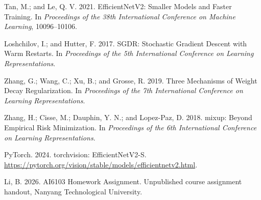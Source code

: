 \documentclass[letterpaper]{article} %
\begin{document}
\begin{thebibliography}{}

Tan, M.; and Le, Q. V. 2021.
EfficientNetV2: Smaller Models and Faster Training.
In \emph{Proceedings of the 38th International Conference on Machine
Learning}, 10096--10106.

Loshchilov, I.; and Hutter, F. 2017.
SGDR: Stochastic Gradient Descent with Warm Restarts.
In \emph{Proceedings of the 5th International Conference on Learning
Representations}.

Zhang, G.; Wang, C.; Xu, B.; and Grosse, R. 2019.
Three Mechanisms of Weight Decay Regularization.
In \emph{Proceedings of the 7th International Conference on Learning
Representations}.

Zhang, H.; Cisse, M.; Dauphin, Y. N.; and Lopez-Paz, D. 2018.
mixup: Beyond Empirical Risk Minimization.
In \emph{Proceedings of the 6th International Conference on Learning
Representations}.

PyTorch. 2024. torchvision: EfficientNetV2-S.
\url{https://pytorch.org/vision/stable/models/efficientnetv2.html}.

Li, B. 2026.
AI6103 Homework Assignment.
Unpublished course assignment handout,
Nanyang Technological University.

\end{thebibliography}
\end{document}
